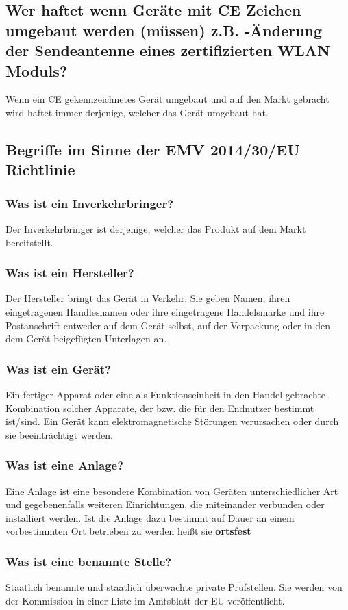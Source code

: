 \subsection{Wer haftet wenn Geräte mit CE Zeichen umgebaut werden (müssen) z.B. -Änderung der Sendeantenne eines zertifizierten WLAN Moduls?}
Wenn ein CE gekennzeichnetes Gerät umgebaut und auf den Markt gebracht wird haftet immer derjenige, welcher das Gerät umgebaut hat.

\subsection{Begriffe im Sinne der EMV 2014/30/EU Richtlinie}
\subsubsection{Was ist ein Inverkehrbringer?}
Der Inverkehrbringer ist derjenige, welcher das Produkt auf dem Markt bereitstellt.

\subsubsection{Was ist ein Hersteller?}
Der Hersteller bringt das Gerät in Verkehr. Sie geben Namen, ihren eingetragenen Handlesnamen oder ihre eingetragene Handelsmarke und ihre Postanschrift entweder auf dem Gerät selbst, auf der Verpackung oder in den dem Gerät beigefügten Unterlagen an.

\subsubsection{Was ist ein Gerät?}
Ein fertiger Apparat oder eine als Funktionseinheit in den Handel gebrachte Kombination solcher Apparate, der bzw. die für den Endnutzer bestimmt ist/sind. Ein Gerät kann elektromagnetische Störungen verursachen oder durch sie beeinträchtigt werden.

\subsubsection{Was ist eine Anlage?}
Eine Anlage ist eine besondere Kombination von Geräten unterschiedlicher Art und gegebenenfalls weiteren Einrichtungen, die miteinander verbunden oder installiert werden.\p
Ist die Anlage dazu bestimmt auf Dauer an einem vorbestimmten Ort betrieben zu werden heißt sie \textbf{ortsfest}

\subsubsection{Was ist eine benannte Stelle?}
Staatlich benannte und staatlich überwachte private Prüfstellen.\p
Sie werden von der Kommission in einer Liste im Amtsblatt der EU veröffentlicht.

